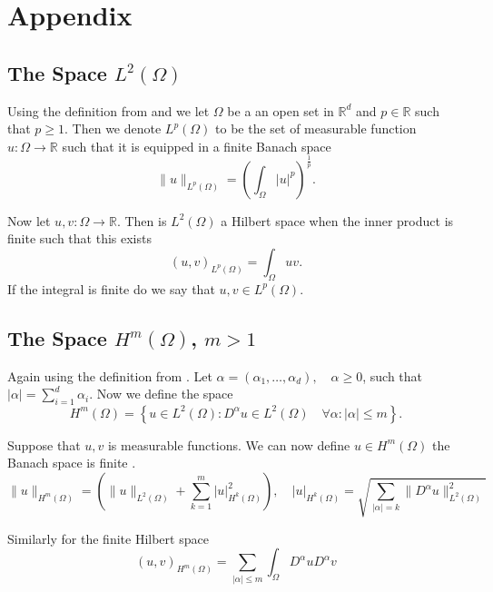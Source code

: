 \newpage
\section{Appendix}%
\label{sec:appendix}

\subsection{The Space $L^{2} \left( \Omega  \right)$ }%
\label{sub:l_2_space}

Using the definition from \cite{manzoni2021optimal} and we let $\Omega $ be a an open set in $\mathbb{R} ^{d}$ and $p \in \mathbb{R} $  such that $p \ge 1$. Then we denote
$L^{p}\left( \Omega  \right) $ to be the set of measurable function $u: \Omega \to \mathbb{R} $ such that  it is equipped
in a finite Banach space \[
\|u\|_{L^{p}\left( \Omega  \right)}^{} = \left( \int_{\Omega }^{} \left\lvert u \right\rvert ^{p}
\right)^{\frac{1}{p}}.
\]

Now let $u,v: \Omega  \to \mathbb{R} $. Then is $L^{2}\left( \Omega  \right)$ a Hilbert space when the inner product is
finite such that this exists \[
\left( u,v \right)_{L^{p}\left( \Omega   \right)} = \int_{\Omega }^{} uv  .
\]
If the integral is finite do we say that $u,v \in L^{p}\left( \Omega  \right)$.



\subsection{The Space $H^{m} \left( \Omega  \right)$, $m>1$  }%
\label{sub:l_2_space}

Again using the definition from \cite{manzoni2021optimal}. Let $\alpha=\left( \alpha _{1}, \ldots, \alpha _{d} \right),
\quad \alpha \ge  0$, such that $\left\lvert \alpha  \right\rvert = \sum_{i=1}^{d} \alpha _{i} $. Now we define
the space \[
H^{m}\left( \Omega  \right) = \left\{ u \in L^2\left( \Omega  \right) : D^{\alpha } u \in L^2\left( \Omega  \right)\quad
\forall \alpha : \left\lvert \alpha  \right\rvert  \le  m \right\}.
\]       


Suppose that $u,v$ is measurable functions. We can now define $u \in H^{m}\left( \Omega  \right)$  the Banach space is
finite . \[
\|u\|_{H^{m}\left( \Omega  \right)}^{} = \left( \|u\|_{L^2\left( \Omega  \right)}^{}  + \sum_{k=1}^{m}
\left\lvert u \right\rvert ^2 _{H^{k}\left( \Omega  \right)} \right), \quad \left\lvert u \right\rvert_ { H^{k} \left(
\Omega  \right) }  = \sqrt{\sum_{\left\lvert \alpha  \right\rvert = k  }^{} \| D^{\alpha }u \|_{L^2\left( \Omega  \right)
}^{ 2 } } 
 \]  

 Similarly for the finite Hilbert space \[
 \left( u,v \right)_{ H^{m} \left( \Omega  \right)}  = \sum_{\left\lvert \alpha  \right\rvert  \le  m}^{}  \int_{\Omega }^{}
 D^{\alpha } u D^{\alpha } v 
 \] 

 





